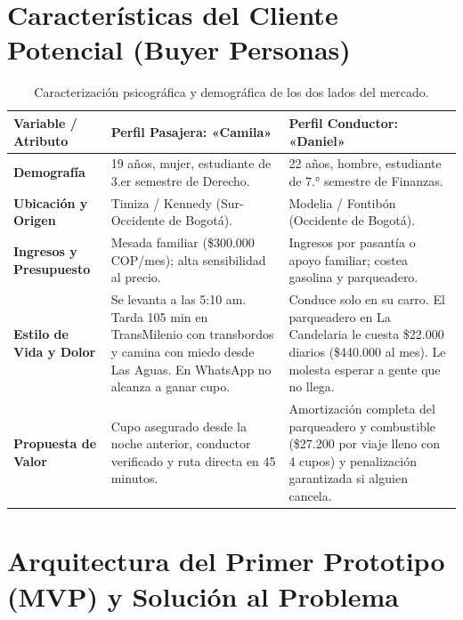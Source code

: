 \documentclass[11pt,a4paper]{article}
\begin{document}
\section{Características del Cliente Potencial (Buyer Personas)}

\begin{table}[h!]
\centering
\small
\begin{tabularx}{\textwidth}{p{3.8cm} X X}
\toprule
\textbf{Variable / Atributo} & \textbf{Perfil Pasajera: «Camila»} & \textbf{Perfil Conductor: «Daniel»} \\
\midrule
\textbf{Demografía} & 19 años, mujer, estudiante de 3.er semestre de Derecho. & 22 años, hombre, estudiante de 7.° semestre de Finanzas. \\
\textbf{Ubicación y Origen} & Timiza / Kennedy (Sur-Occidente de Bogotá). & Modelia / Fontibón (Occidente de Bogotá). \\
\textbf{Ingresos y Presupuesto} & Mesada familiar (\$300.000 COP/mes); alta sensibilidad al precio. & Ingresos por pasantía o apoyo familiar; costea gasolina y parqueadero. \\
\textbf{Estilo de Vida y Dolor} & Se levanta a las 5:10 am. Tarda 105 min en TransMilenio con transbordos y camina con miedo desde Las Aguas. En WhatsApp no alcanza a ganar cupo. & Conduce solo en su carro. El parqueadero en La Candelaria le cuesta \$22.000 diarios (\$440.000 al mes). Le molesta esperar a gente que no llega. \\
\textbf{Propuesta de Valor} & Cupo asegurado desde la noche anterior, conductor verificado y ruta directa en 45 minutos. & Amortización completa del parqueadero y combustible (\$27.200 por viaje lleno con 4 cupos) y penalización garantizada si alguien cancela. \\
\bottomrule
\end{tabularx}
\caption{Caracterización psicográfica y demográfica de los dos lados del mercado.}
\end{table}

\section{Arquitectura del Primer Prototipo (MVP) y Solución al Problema}
\end{document}
